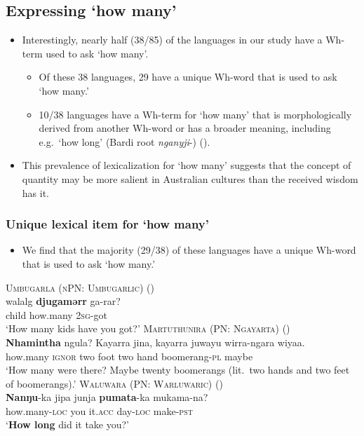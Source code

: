 \documentclass{article}
\makeatletter
\newcommand{\ofy}{/85} %
\makeatother
\begin{document}
\subsection{Expressing `how many'}
\begin{itemize}
\item Interestingly, nearly half (38\ofy{}) of the  languages in our study have a Wh-term used to ask `how many'. 
  \begin{itemize}
  \item Of these 38 languages, 29 have a unique Wh-word that is used to ask `how many.'
  \item 10/38 languages have a Wh-term for `how many' that is morphologically derived from another Wh-word or has a broader meaning, including e.g.\ `how long' (Bardi root \textit{nganyji}-) (\citealt{bowern12}).
  \end{itemize}
\item This prevalence of lexicalization for `how many' suggests that the concept of quantity may be more salient in Australian cultures than the received wisdom has it.
\end{itemize}

\subsubsection{Unique lexical item for `how many'}
\begin{itemize}
\item We find that the majority (29/38) of these languages have a unique Wh-word that is used to ask `how many.'
\end{itemize}
\begin{exe}
  \ex \textsc{Umbugarla (nPN: Umbugarlic)} (\citealt[57]{davies89}) \\
  \gll walalg    \textbf{djugamərr}    ga-rar?\\
  child        how.many    2\textsc{sg}-got \\
  \glt `How many kids have you got?'
  \ex \textsc{Martuthunira (PN: Ngayarta)} (\citealt[190]{dench95})\\
  \gll \textbf{Nhamintha} ngula? Kayarra jina, kayarra juwayu wirra-ngara wiyaa.\\
  how.many \textsc{ignor} two foot two hand boomerang-\textsc{pl} maybe\\
  \glt `How many were there? Maybe twenty boomerangs (lit.\ two hands and two feet of boomerangs).'
  \ex \textsc{Waluwara (PN: Warluwaric)} (\citealt[260]{breen71})\\
  \gll \textbf{Nanŋu}-ka       jipa  junja    \textbf{pumata}-ka mukama-na?\\
  how.many-\textsc{loc} you it.\textsc{acc} day-\textsc{loc} make-\textsc{pst}\\
  \glt `\textbf{How long} did it take you?'
\end{exe}
\end{document}
